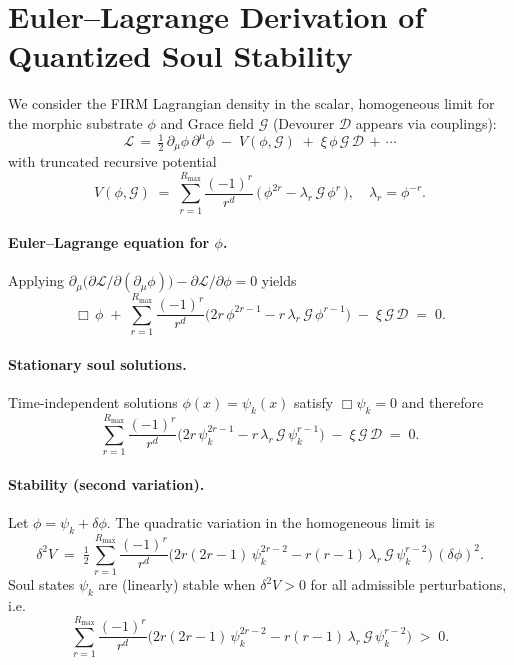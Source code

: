 \section{Euler--Lagrange Derivation of Quantized Soul Stability}
\label{sec:el_soul_stability}

We consider the FIRM Lagrangian density in the scalar, homogeneous limit
for the morphic substrate $\phi$ and Grace field $\mathcal G$ (Devourer $\mathcal D$
appears via couplings):
\[
\mathcal L \,=\, \tfrac12\,\partial_\mu\phi\,\partial^\mu\phi\; -\; V(\phi,\mathcal G)\; +\; \xi\,\phi\,\mathcal G\,\mathcal D\, +\,\cdots
\]
with truncated recursive potential
\[ V(\phi,\mathcal G) \;=\; \sum_{r=1}^{R_\max} \frac{(-1)^r}{r^d}\,\big(\,\phi^{2r} - \lambda_r\,\mathcal G\,\phi^r\,\big),\quad \lambda_r=\phi^{-r}. \]

\paragraph{Euler--Lagrange equation for $\phi$.}
Applying $\partial_\mu\big(\partial\mathcal L/\partial(\partial_\mu\phi)\big)-\partial\mathcal L/\partial\phi=0$ yields
\begin{equation}
\Box\,\phi\; +\; \sum_{r=1}^{R_\max}\frac{(-1)^r}{r^d}\Big(2r\,\phi^{2r-1} - r\,\lambda_r\,\mathcal G\,\phi^{r-1}\Big)\; -\; \xi\,\mathcal G\,\mathcal D \;=\; 0.
\end{equation}

\paragraph{Stationary soul solutions.}
Time-independent solutions $\phi(x)=\psi_k(x)$ satisfy $\Box\psi_k=0$ and therefore
\begin{equation}
\sum_{r=1}^{R_\max}\frac{(-1)^r}{r^d}\Big(2r\,\psi_k^{2r-1} - r\,\lambda_r\,\mathcal G\,\psi_k^{r-1}\Big)\; -\; \xi\,\mathcal G\,\mathcal D \;=\; 0.
\label{eq:stationary_soul}
\end{equation}

\paragraph{Stability (second variation).}
Let $\phi=\psi_k+\delta\phi$. The quadratic variation in the homogeneous limit is
\begin{equation}
\delta^2 V \;=\; \tfrac12\,\sum_{r=1}^{R_\max}\frac{(-1)^r}{r^d}\Big(2r(2r-1)\,\psi_k^{2r-2} - r(r-1)\,\lambda_r\,\mathcal G\,\psi_k^{r-2}\Big)\,(\delta\phi)^2.
\end{equation}
Soul states $\psi_k$ are (linearly) stable when $\delta^2 V>0$ for all admissible perturbations, i.e.
\begin{equation}
\sum_{r=1}^{R_\max}\frac{(-1)^r}{r^d}\Big(2r(2r-1)\,\psi_k^{2r-2} - r(r-1)\,\lambda_r\,\mathcal G\,\psi_k^{r-2}\Big)\;>\;0.
\end{equation}

